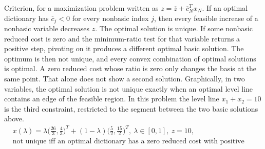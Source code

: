 \documentclass[a4paper,11pt]{article}
\newif\ifexplain
\newcommand{\explain}[1]{\ifexplain\begin{erklbox}#1\end{erklbox}\fi}
\newcommand{\explainfig}[1]{\ifexplain\begin{center}#1\end{center}\fi}
\begin{document}
\explainfig{\begin{tikzpicture}[scale=0.42,>=stealth]
  \draw (0,0) -- (8,0) -- ({26/3},{4/3}) -- (2.5,7.5) -- (0,5) -- cycle;
  \draw[->,thick] (0.15,0.15) -- (7.7,0.15);
  \draw[->,thick] (7.85,0.2) -- (8.2,1.05);
  \draw[->,thick] (0.15,0.2) -- (0.15,4.7);
  \draw[->,thick] (0.25,5.15) -- (2.3,7.2);
  \node[below] at (4,-0.35) {erster Lauf: $x_1$ rein};
  \node[left] at (-0.15,2.6) {zweiter Lauf: $x_2$ rein};
  \fill[red] ({26/3},{4/3}) circle (2pt);
  \fill[red] (2.5,7.5) circle (2pt);
\end{tikzpicture}}
Criterion, for a maximization problem written as $z=\overline z+\overline c_N^T x_N$. If an optimal dictionary has $\overline c_j<0$ for every nonbasic index $j$, then every feasible increase of a nonbasic variable decreases $z$. The optimal solution is unique. If some nonbasic reduced cost is zero and the minimum-ratio test for that variable returns a positive step, pivoting on it produces a different optimal basic solution. The optimum is then not unique, and every convex combination of optimal solutions is optimal. A zero reduced cost whose ratio is zero only changes the basis at the same point. That alone does not show a second solution.
Graphically, in two variables, the optimal solution is not unique exactly when an optimal level line contains an edge of the feasible region. In this problem the level line $x_1+x_2=10$ is the third constraint, restricted to the segment between the two basic solutions above.
\[\boxed{\begin{aligned}
&x(\lambda)=\lambda\bigl(\tfrac{26}{3},\tfrac43\bigr)^T+(1-\lambda)\bigl(\tfrac52,\tfrac{15}{2}\bigr)^T,\ \lambda\in[0,1],\ z=10,\\
&\text{not unique iff an optimal dictionary has a zero reduced cost with positive step.}
\end{aligned}}\]
\explain{Die Dictionary-Regel gilt auch in höheren Dimensionen, nicht nur in der Zeichnung mit zwei Variablen. Strikt negative reduzierte Kosten schließen jede andere zulässige Verbesserung aus, nicht bloß eine andere Basis desselben Punkts. Eine reduzierte Kosten von null mit positivem Quotienten ist die Kante, die man in der Zeichnung sieht. Hier ist der Quotient positiv. Ist der Quotient null, bleibt man auf demselben Punkt. Das wäre Degeneration. Hier tritt sie nicht auf.}
\end{document}
